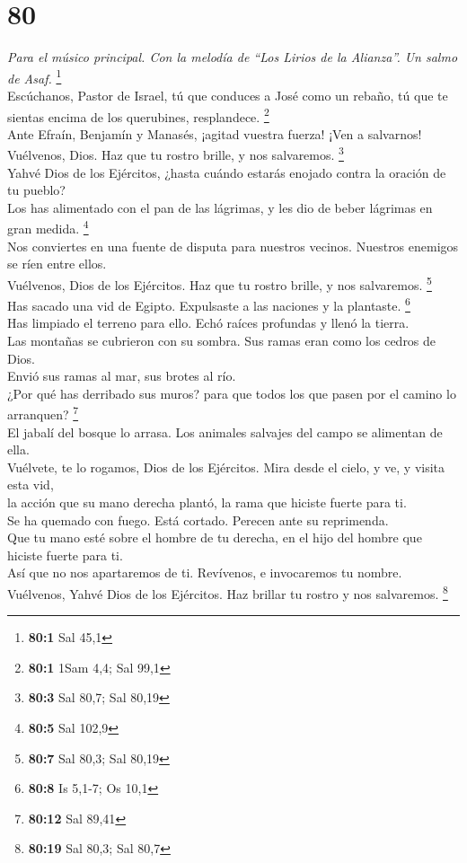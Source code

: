 \hypertarget{section-77}{%
\section{80}\label{section-77}}

\emph{Para el músico principal. Con la melodía de ``Los Lirios de la
Alianza''. Un salmo de Asaf.} \footnote{\textbf{80:1} Sal 45,1}\\
 Escúchanos, Pastor de Israel, tú que conduces a José como
un rebaño, tú que te sientas encima de los querubines, resplandece.
\footnote{\textbf{80:1} 1Sam 4,4; Sal 99,1}\\
 Ante Efraín, Benjamín y Manasés, ¡agitad vuestra fuerza!
¡Ven a salvarnos!\\
 Vuélvenos, Dios. Haz que tu rostro brille, y nos
salvaremos. \footnote{\textbf{80:3} Sal 80,7; Sal 80,19}\\
 Yahvé Dios de los Ejércitos, ¿hasta cuándo estarás
enojado contra la oración de tu pueblo?\\
 Los has alimentado con el pan de las lágrimas, y les dio
de beber lágrimas en gran medida. \footnote{\textbf{80:5} Sal 102,9}\\
 Nos conviertes en una fuente de disputa para nuestros
vecinos. Nuestros enemigos se ríen entre ellos.\\
 Vuélvenos, Dios de los Ejércitos. Haz que tu rostro
brille, y nos salvaremos. \footnote{\textbf{80:7} Sal 80,3; Sal 80,19}\\
 Has sacado una vid de Egipto. Expulsaste a las naciones y
la plantaste. \footnote{\textbf{80:8} Is 5,1-7; Os 10,1}\\
 Has limpiado el terreno para ello. Echó raíces profundas
y llenó la tierra.\\
 Las montañas se cubrieron con su sombra. Sus ramas eran
como los cedros de Dios.\\
 Envió sus ramas al mar, sus brotes al río.\\
 ¿Por qué has derribado sus muros? para que todos los que
pasen por el camino lo arranquen? \footnote{\textbf{80:12} Sal 89,41}\\
 El jabalí del bosque lo arrasa. Los animales salvajes
del campo se alimentan de ella.\\
 Vuélvete, te lo rogamos, Dios de los Ejércitos. Mira
desde el cielo, y ve, y visita esta vid,\\
 la acción que su mano derecha plantó, la rama que
hiciste fuerte para ti.\\
 Se ha quemado con fuego. Está cortado. Perecen ante su
reprimenda.\\
 Que tu mano esté sobre el hombre de tu derecha, en el
hijo del hombre que hiciste fuerte para ti.\\
 Así que no nos apartaremos de ti. Revívenos, e
invocaremos tu nombre.\\
 Vuélvenos, Yahvé Dios de los Ejércitos. Haz brillar tu
rostro y nos salvaremos. \footnote{\textbf{80:19} Sal 80,3; Sal 80,7}

